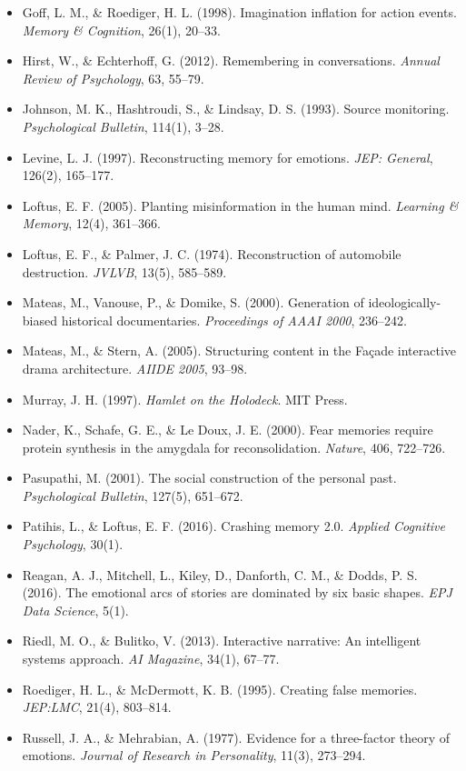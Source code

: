 \documentclass[11pt, a4paper]{article}
\begin{document}
\begin{itemize}
  \item Goff, L. M., \& Roediger, H. L. (1998). Imagination inflation for action events. \textit{Memory \& Cognition}, 26(1), 20--33.
  \item Hirst, W., \& Echterhoff, G. (2012). Remembering in conversations. \textit{Annual Review of Psychology}, 63, 55--79.
  \item Johnson, M. K., Hashtroudi, S., \& Lindsay, D. S. (1993). Source monitoring. \textit{Psychological Bulletin}, 114(1), 3--28.
  \item Levine, L. J. (1997). Reconstructing memory for emotions. \textit{JEP: General}, 126(2), 165--177.
  \item Loftus, E. F. (2005). Planting misinformation in the human mind. \textit{Learning \& Memory}, 12(4), 361--366.
  \item Loftus, E. F., \& Palmer, J. C. (1974). Reconstruction of automobile destruction. \textit{JVLVB}, 13(5), 585--589.
  \item Mateas, M., Vanouse, P., \& Domike, S. (2000). Generation of ideologically-biased historical documentaries. \textit{Proceedings of AAAI 2000}, 236--242.
  \item Mateas, M., \& Stern, A. (2005). Structuring content in the Façade interactive drama architecture. \textit{AIIDE 2005}, 93--98.
  \item Murray, J. H. (1997). \textit{Hamlet on the Holodeck}. MIT Press.
  \item Nader, K., Schafe, G. E., \& Le Doux, J. E. (2000). Fear memories require protein synthesis in the amygdala for reconsolidation. \textit{Nature}, 406, 722--726.
  \item Pasupathi, M. (2001). The social construction of the personal past. \textit{Psychological Bulletin}, 127(5), 651--672.
  \item Patihis, L., \& Loftus, E. F. (2016). Crashing memory 2.0. \textit{Applied Cognitive Psychology}, 30(1).
  \item Reagan, A. J., Mitchell, L., Kiley, D., Danforth, C. M., \& Dodds, P. S. (2016). The emotional arcs of stories are dominated by six basic shapes. \textit{EPJ Data Science}, 5(1).
  \item Riedl, M. O., \& Bulitko, V. (2013). Interactive narrative: An intelligent systems approach. \textit{AI Magazine}, 34(1), 67--77.
  \item Roediger, H. L., \& McDermott, K. B. (1995). Creating false memories. \textit{JEP:LMC}, 21(4), 803--814.
  \item Russell, J. A., \& Mehrabian, A. (1977). Evidence for a three-factor theory of emotions. \textit{Journal of Research in Personality}, 11(3), 273--294.

\end{itemize}
\end{document}
